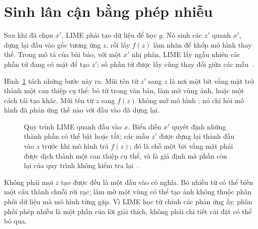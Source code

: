 \section{Sinh lân cận bằng phép nhiễu}
\label{sec:ch03-sinh-lan-can}

%
Sau khi đã chọn $x'$, LIME phải tạo dữ liệu để học $g$. Nó sinh các
 $z'$ quanh $x'$, dựng lại đầu vào gốc tương ứng
$z$, rồi lấy $f(z)$ làm nhãn để khớp mô hình thay thế. Trong mô tả của bài báo,
với một $x'$ nhị phân, LIME lấy ngẫu nhiên các phần tử đang có mặt để tạo
$z'$; số phần tử được lấy cũng thay đổi giữa các
mẫu~\autocite{p09lime}.

Hình~\ref{fig:ch03-quy-trinh-lime} tách những bước này ra. Mũi tên từ $z'$ sang
$z$ là nơi một bit vắng mặt trở thành một can thiệp cụ thể: bỏ từ trong văn
bản, làm mờ vùng ảnh, hoặc một cách tái tạo khác. Mũi tên từ $z$ sang $f(z)$
không mở mô hình ; nó chỉ hỏi mô hình đã phản ứng thế
nào với đầu vào
đã dựng lại.

\begin{figure}[htbp]
  \centering
  
  \caption{Quy trình LIME quanh đầu vào $x$. Biểu diễn $x'$ quyết định những
  thành phần có thể bật hoặc tắt; các mẫu $z'$ được dựng lại thành đầu vào $z$
  trước khi mô hình trả $f(z)$; đó là chỗ một bit vắng mặt phải được dịch
  thành một can thiệp cụ thể, và là giả định mà phần còn lại của quy trình
  không kiểm tra lại~\autocite{p09lime}.}
  \label{fig:ch03-quy-trinh-lime}
\end{figure}

Không phải mọi $z$ tạo được đều là một đầu vào có nghĩa. Bỏ nhiều từ có thể
biến một câu thành chuỗi rời rạc; làm mờ một vùng có thể tạo ảnh không thuộc
phân phối dữ liệu mà mô hình từng gặp. Vì LIME học từ chính các phản ứng ấy,
phân phối phép nhiễu là một phần của lời giải thích, không phải chi tiết cài
đặt có thể bỏ qua.

